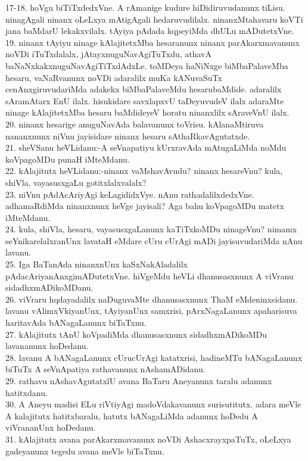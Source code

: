 \documentclass{article}
\begin{document}
17-18. hoVgu biTiTxdedxVne. A rAmanige kudure hiDidiruvudanunx tiLisu. ninagAgali ninanx oLeLxya mAtigAgali hedaruvudilalx. ninanxMtahavaru koVTi jana baMdarU lekakxvilalx. tAyiya pAdada kqpeyiMda dhULu mADutetxVne.\\
19. ninanx tAyiyu ninage kAlajitetxMba hesaranunx ninanx parAkarxmavanunx noVDi iTuTxdalalx, jAtayxnuguNavAgiTuTxdu, athavA baNaNxkakxnuguNavAgiTiTxdAdxLe. toMDeya haNiNxge biMbaPalaveMba hesaru, vaNaRvanunx noVDi adaralilx muKa kANuvaSuTx cenAnxgiruvudariMda adakekx biMbaPalaveMdu hesarubaMdide. adaralilx sAramAtarx EnU ilalx. hisukidare savxlapxvU taDeyuvudeV ilalx adaraMte ninage kAlajitetxMba hesaru baMdideyeV horatu ninanxlilx sAraveVnU ilalx.\\
20. ninanx hesarige anuguNavAda balavanunx toVrisu. kAlanaMtiruva nananxnunx niVnu jayisidare ninanx hesaru sAthaRkavAgutatxde.\\
21. sheVSanu heVLidanu:-A seVnapatiyu kUrxravAda mAtugaLiMda noMdu koVpagoMDu punaH iMteMdanu.\\
22. kAlajitutx heVLidanu:-ninanx vaMshavAvudu? ninanx hesareVnu? kula, shiVla, vayasusxgaLu gotitxlalxvalalx?\\
23. niVnu pAdAcAriyAgi keLagididxVye. nAnu rathadalilxdedxVne. adhamaRdiMda ninanxnunx heVge jayisali? Aga bahu koVpagoMDu matetx iMteMdanu.\\
24. kula, shiVla, hesaru, vayasusxgaLanunx kaTiTxkoMDu ninageVnu? nimamx seYnikarelalxranUnx lavataH eMdare cUru cUrAgi mADi jayisuvudariMda nAnu lavanu.\\
25. Iga BaTanAda ninanxnUnx kaSxNakAladalilx pAdacAriyanAnxgimADutetxVne. hiVgeMdu heVLi dhanusasxnunx A viVranu sidadhxmADikoMDanu.\\
26. viVraru hqdayadalilx naDuguvaMte dhanusasxnunx ThaM eMdeninxsidanu. lavanu vAlimxVkiyanUnx, tAyiyanUnx samxrisi, pArxNagaLanunx apaharisuva haritavAda bANagaLanunx biTaTxnu.\\
27. kAlajitutx tAnU koVpadiMda dhanusasxnunx sidadhxmADikoMDu lavananunx hoDedanu.\\
28. lavanu A bANagaLanunx cUrucUrAgi katatxrisi, hadineMTu bANagaLanunx biTuTx A seVnApatiya rathavanunx nAshamADidanu.\\
29. rathavu nAshavAgutatxlU avana BaTaru Aneyanunx taralu adanunx hatitxdanu.\\
30. A Aneyu madisi ELu riVtiyAgi madoVdakavanunx surisutitutx. adara meVle A kalajitutx hatitxbaralu, hatutx bANagaLiMda adanunx hoDedu A viVrananUnx hoDedanu.\\
31. kAlajitutx avana parAkarxmavanunx noVDi AshacxrayxpaTuTx, oLeLxya gadeyanunx tegedu avana meVle biTaTxnu.\\
\end{document}
